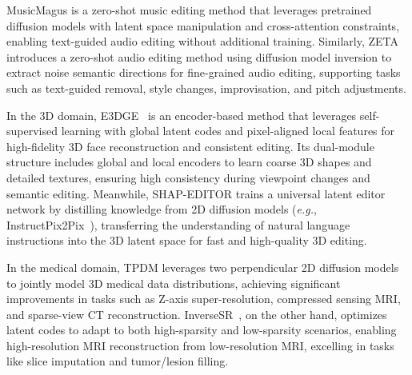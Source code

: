 MusicMagus\cite{MusicMagus} is a zero-shot music editing method that leverages pretrained diffusion models with latent space manipulation and cross-attention constraints, enabling text-guided audio editing without additional training. Similarly, ZETA~\cite{ZETA} introduces a zero-shot audio editing method using diffusion model inversion to extract noise semantic directions for fine-grained audio editing, supporting tasks such as text-guided removal, style changes, improvisation, and pitch adjustments.

In the 3D domain, E3DGE~\cite{E3DGE} is an encoder-based method that leverages self-supervised learning with global latent codes and pixel-aligned local features for high-fidelity 3D face reconstruction and consistent editing. Its dual-module structure includes global and local encoders to learn coarse 3D shapes and detailed textures, ensuring high consistency during viewpoint changes and semantic editing. Meanwhile, SHAP-EDITOR\cite{SHAP-EDITOR} trains a universal latent editor network by distilling knowledge from 2D diffusion models (\textit{e.g.}, InstructPix2Pix~\cite{InstructPix2Pix}), transferring the understanding of natural language instructions into the 3D latent space for fast and high-quality 3D editing.

In the medical domain, TPDM\cite{TPDM} leverages two perpendicular 2D diffusion models to jointly model 3D medical data distributions, achieving significant improvements in tasks such as Z-axis super-resolution, compressed sensing MRI, and sparse-view CT reconstruction. InverseSR~\cite{InverseSR}, on the other hand, optimizes latent codes to adapt to both high-sparsity and low-sparsity scenarios, enabling high-resolution MRI reconstruction from low-resolution MRI, excelling in tasks like slice imputation and tumor/lesion filling.



